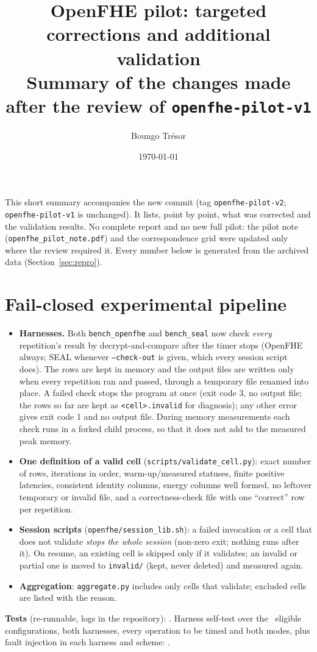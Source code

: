 \documentclass[11pt]{article}
\title{OpenFHE pilot: targeted corrections and additional validation\\[2pt]\large Summary of the changes made after the review of \texttt{openfhe-pilot-v1}}
\author{Boungo Tr\'esor}
\date{\today}
\begin{document}
\maketitle

\noindent This short summary accompanies the new commit (tag \texttt{openfhe-pilot-v2}; \texttt{openfhe-pilot-v1} is unchanged). It lists, point by point, what was corrected and the validation results. No complete report and no new full pilot: the pilot note (\texttt{openfhe\_pilot\_note.pdf}) and the correspondence grid were updated only where the review required it. Every number below is generated from the archived data (Section~\ref{sec:repro}).

\section{Fail-closed experimental pipeline}

\begin{itemize}[leftmargin=*, itemsep=2pt]
  \item \textbf{Harnesses.} Both \texttt{bench\_openfhe} and \texttt{bench\_seal} now check \emph{every} repetition's result by decrypt-and-compare after the timer stops (OpenFHE always; SEAL whenever \texttt{--check-out} is given, which every session script does). The rows are kept in memory and the output files are written only when every repetition ran and passed, through a temporary file renamed into place. A failed check stops the program at once (exit code 3, no output file; the rows so far are kept as \texttt{<cell>.invalid} for diagnosis); any other error gives exit code 1 and no output file. During memory measurements each check runs in a forked child process, so that it does not add to the measured peak memory.
  \item \textbf{One definition of a valid cell} (\texttt{scripts/validate\_cell.py}): exact number of rows, iterations in order, warm-up/measured statuses, finite positive latencies, consistent identity columns, energy columns well formed, no leftover temporary or invalid file, and a correctness-check file with one ``correct'' row per repetition.
  \item \textbf{Session scripts} (\texttt{openfhe/session\_lib.sh}): a failed invocation or a cell that does not validate \emph{stops the whole session} (non-zero exit; nothing runs after it). On resume, an existing cell is skipped only if it validates; an invalid or partial one is moved to \texttt{invalid/} (kept, never deleted) and measured again.
  \item \textbf{Aggregation}: \texttt{aggregate.py} includes only cells that validate; excluded cells are listed with the reason.
\end{itemize}
\textbf{Tests} (re-runnable, logs in the repository): \FailClosedSummary. Harness self-test over the \eligible\ eligible configurations, both harnesses, every operation to be timed and both modes, plus fault injection in each harness and scheme: \SelfTestSummary.
\end{document}
